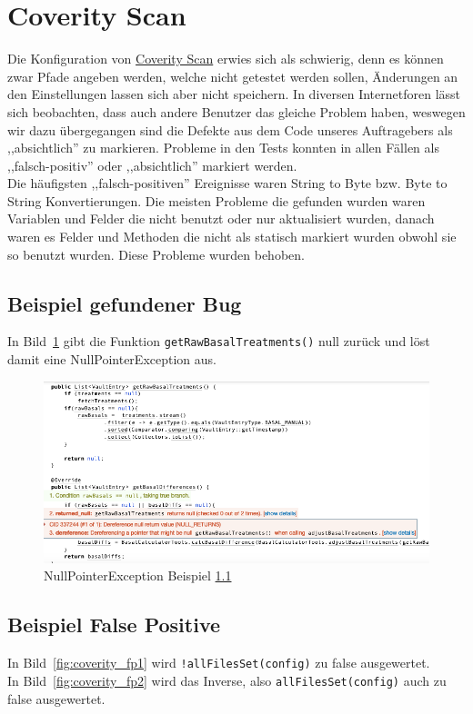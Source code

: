 \documentclass[accentcolor=tud0b,12pt,paper=a4]{tudreport}
\begin{document}
\section{Coverity Scan}
Die Konfiguration von \href{https://scan.coverity.com/projects/tuda-bp-11-opendiabetes-uam-heuristik}{Coverity Scan} erwies sich als schwierig, denn es können zwar Pfade angeben werden, welche nicht getestet werden sollen, Änderungen an den Einstellungen lassen sich aber nicht speichern. In diversen Internetforen lässt sich beobachten, dass auch andere Benutzer das gleiche Problem haben, weswegen wir dazu übergegangen sind die Defekte aus dem Code unseres Auftragebers als ,,absichtlich'' zu markieren. Probleme in den Tests konnten in allen Fällen als ,,falsch-positiv'' oder ,,absichtlich'' markiert werden.\\
Die häufigsten ,,falsch-positiven'' Ereignisse waren String to Byte bzw. Byte to String Konvertierungen.
Die meisten Probleme die gefunden wurden waren Variablen und Felder die nicht benutzt oder nur aktualisiert wurden, danach waren es Felder und Methoden die nicht als statisch markiert wurden obwohl sie so benutzt wurden. Diese Probleme wurden behoben.

\subsection{Beispiel gefundener Bug}
\label{sec:coverity_bug}
In Bild~\ref{fig:coverity_bug} gibt die Funktion \texttt{getRawBasalTreatments()} null zurück und löst damit eine NullPointerException aus.

\begin{figure}[h]
\includegraphics[width=1.0\textwidth]{Coverity_Bug}
\caption{NullPointerException Beispiel \ref{sec:coverity_bug}}
\centering
\label{fig:coverity_bug}
\end{figure}

\subsection{Beispiel False Positive}
\label{sec:coverity_fp}
In Bild~\ref{fig:coverity_fp1} wird \texttt{!allFilesSet(config)} zu false ausgewertet.
\\
In Bild~\ref{fig:coverity_fp2} wird das Inverse, also \texttt{allFilesSet(config)} auch zu false ausgewertet.
\end{document}
